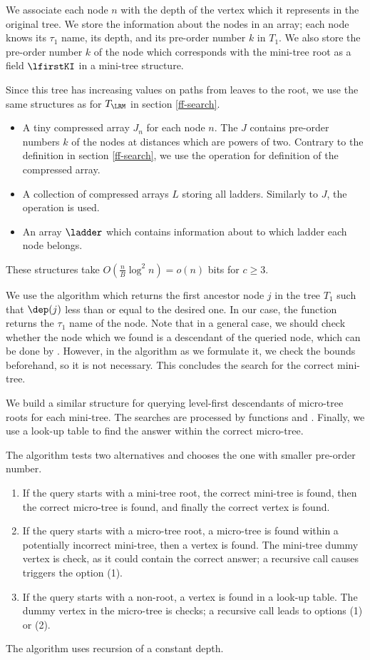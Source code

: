 We associate each node $n$ with the depth of the vertex which it represents in the original tree.
We store the information about the nodes in an array; each node knows its $\tau_1$ name, its depth, and its pre-order number $k$ in $T_1$.
We also store the pre-order number $k$ of the node which corresponds with the mini-tree root as a field $\lfirstKI$ in a mini-tree structure.

Since this tree has increasing values on paths from leaves to the root, we use the same structures as for $T_{\LRM}$ in section \ref{ff-search}.
\begin{itemize}
	\item A tiny compressed array $J_n$ for each node $n$.
	The $J$ contains pre-order numbers $k$ of the nodes at distances which are powers of two.
	Contrary to the definition in section \ref{ff-search}, we use the operation \pred{} for definition of the compressed array.
	\item A collection of compressed arrays $L$ storing all ladders.
	Similarly to $J$, the operation \pred{} is used.
	\item An array $\ladder$ which contains information about to which ladder each node belongs.
\end{itemize}
These structures take $O\left(\frac{n}{B} \log^2 n\right) = o(n)$ bits for $c \ge 3$.

We use the algorithm \LRMSearch{} which returns the first ancestor node $j$ in the tree $T_1$ such that $\dep(j)$ less than or equal to the desired one.
In our case, the function returns the $\tau_1$ name of the node.
Note that in a general case, we should check whether the node which we found is a descendant of the queried node, which can be done by \isAncestor{}.
However, in the algorithm as we formulate it, we check the bounds beforehand, so it is not necessary.
This concludes the search for the correct mini-tree.

We build a similar structure for querying level-first descendants of micro-tree roots for each mini-tree.
The searches are processed by functions \ldSearchI{} and \ldSearchII{}.
Finally, we use a look-up table to find the answer within the correct micro-tree.

The algorithm tests two alternatives and chooses the one with smaller pre-order number.
\begin{enumerate}
	\item If the query starts with a mini-tree root, the correct mini-tree is found, then the correct micro-tree is found, and finally the correct vertex is found.
	\item If the query starts with a micro-tree root, a micro-tree is found within a potentially incorrect mini-tree, then a vertex is found.
	The mini-tree dummy vertex is check, as it could contain the correct answer; a recursive call causes triggers the option (1).
	\item If the query starts with a non-root, a vertex is found in a look-up table.
	The dummy vertex in the micro-tree is checks; a recursive call leads to options (1) or (2).
\end{enumerate}
The algorithm uses recursion of a constant depth.


